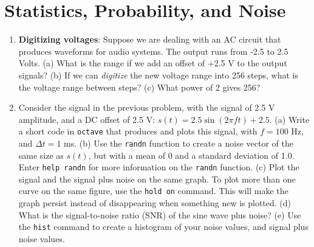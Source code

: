 \documentclass{article}
\begin{document}
\section{Statistics, Probability, and Noise}

\begin{enumerate}
\item \textbf{Digitizing voltages}: Suppose we are dealing with an AC circuit that produces waveforms for audio systems.  The output runs from -2.5 to 2.5 Volts.  (a) What is the range if we add an offset of +2.5 V to the output signals?  (b) If we can \textit{digitize} the new voltage range into 256 steps, what is the voltage range between steps? (c) What power of 2 gives 256? \\ \vspace{4cm}
\item Consider the signal in the previous problem, with the signal of 2.5 V amplitude, and a DC offset of 2.5 V: $s(t) = 2.5\sin(2\pi f t) + 2.5$.  (a) Write a short code in \verb+octave+ that produces and plots this signal, with $f = 100$ Hz, and $\Delta t = 1$ ms. (b) Use the \verb+randn+ function to create a noise vector of the same size as $s(t)$, but with a mean of 0 and a standard deviation of 1.0.  Enter \verb+help randn+ for more information on the \verb+randn+ function. (c) Plot the signal and the signal plus noise on the same graph.  To plot more than one curve on the same figure, use the \verb+hold on+ command.  This will make the graph persist instead of disappearing when something new is plotted. (d) What is the signal-to-noise ratio (SNR) of the sine wave plus noise? (e) Use the \verb+hist+ command to create a histogram of your noise values, and signal plus noise values.
\end{enumerate}
\end{document}

